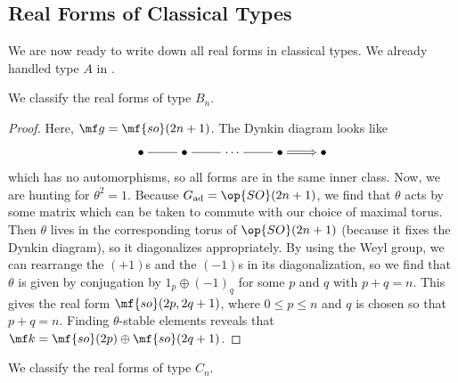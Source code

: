\documentclass[../notes.tex]{subfiles}
\begin{document}
\subsection{Real Forms of Classical Types}
We are now ready to write down all real forms in classical types. We already handled type $A$ in .
\begin{exe} \label{exe:real-form-b}
	We classify the real forms of type $B_n$.
\end{exe}
\begin{proof}
	Here, $\mf g=\mf{so}(2n+1)$. The Dynkin diagram looks like
	\[\begin{tikzcd}[cramped]
		\bullet & \bullet & \cdots & \bullet & \bullet
		\arrow[no head, from=1-1, to=1-2]
		\arrow[no head, from=1-2, to=1-3]
		\arrow[no head, from=1-3, to=1-4]
		\arrow[Rightarrow, from=1-4, to=1-5]
	\end{tikzcd}\]
	which has no automorphisms, so all forms are in the same inner class. Now, we are hunting for $\theta^2=1$. Because $G_{\mathrm{ad}}=\op{SO}(2n+1)$, we find that $\theta$ acts by some matrix which can be taken to commute with our choice of maximal torus. Then $\theta$ lives in the corresponding torus of $\op{SO}(2n+1)$ (because it fixes the Dynkin diagram), so it diagonalizes appropriately. By using the Weyl group, we can rearrange the $(+1)$s and the $(-1)$s in its diagonalization, so we find that $\theta$ is given by conjugation by $1_p\oplus(-1)_q$ for some $p$ and $q$ with $p+q=n$. This gives the real form $\mf{so}(2p,2q+1)$, where $0\le p\le n$ and $q$ is chosen so that $p+q=n$. Finding $\theta$-stable elements reveals that $\mf k=\mf{so}(2p)\oplus\mf{so}(2q+1)$.
\end{proof}
\begin{exe}
	We classify the real forms of type $C_n$.
\end{exe}
\end{document}
